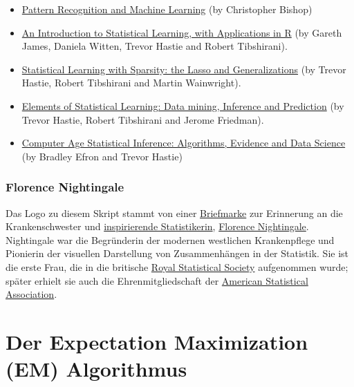 \documentclass[
  ngerman,
]{book}
\begin{document}
\begin{itemize}
\item
  \href{https://www.microsoft.com/en-us/research/uploads/prod/2006/01/Bishop-Pattern-Recognition-and-Machine-Learning-2006.pdf}{Pattern Recognition and Machine Learning} (by Christopher Bishop)
\item
  \href{https://trevorhastie.github.io/ISLR/}{An Introduction to Statistical Learning, with Applications in R} (by Gareth James, Daniela Witten, Trevor Hastie and Robert Tibshirani).
\item
  \href{https://web.stanford.edu/~hastie/StatLearnSparsity/}{Statistical Learning with Sparsity: the Lasso and Generalizations} (by Trevor Hastie, Robert Tibshirani and Martin Wainwright).
\item
  \href{https://web.stanford.edu/~hastie/ElemStatLearn/}{Elements of Statistical Learning: Data mining, Inference and Prediction} (by Trevor Hastie, Robert Tibshirani and Jerome Friedman).
\item
  \href{https://web.stanford.edu/~hastie/CASI/}{Computer Age Statistical Inference: Algorithms, Evidence and Data Science} (by Bradley Efron and Trevor Hastie)
\end{itemize}

\hypertarget{florence-nightingale}{%
\subsection*{Florence Nightingale}\label{florence-nightingale}}

Das Logo zu diesem Skript stammt von einer \href{https://de.wikipedia.org/wiki/Datei:DBP_1955_225_Florence_Nightingale.jpg}{Briefmarke} zur Erinnerung an die Krankenschwester und \href{https://infowetrust.com/project/designhero}{inspirierende Statistikerin}, \href{https://de.wikipedia.org/wiki/Florence_Nightingale}{Florence Nightingale}. Nightingale war die Begründerin der modernen westlichen Krankenpflege und Pionierin der visuellen Darstellung von Zusammenhängen in der Statistik. Sie ist die erste Frau, die in die britische \href{https://rss.org.uk/}{Royal Statistical Society} aufgenommen wurde; später erhielt sie auch die Ehrenmitgliedschaft der \href{https://www.amstat.org/}{American Statistical Association}.

\hypertarget{der-expectation-maximization-em-algorithmus}{%
\chapter{Der Expectation Maximization (EM) Algorithmus}\label{der-expectation-maximization-em-algorithmus}}
\end{document}
